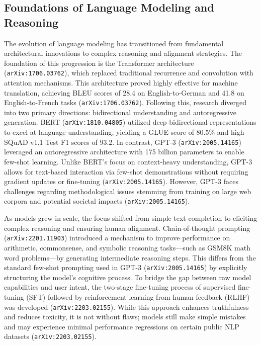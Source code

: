 \documentclass[11pt]{article}
\begin{document}
\subsection{Foundations of Language Modeling and Reasoning}

The evolution of language modeling has transitioned from fundamental architectural innovations to complex reasoning and alignment strategies. The foundation of this progression is the Transformer architecture (\texttt{arXiv:1706.03762}), which replaced traditional recurrence and convolution with attention mechanisms. This architecture proved highly effective for machine translation, achieving BLEU scores of 28.4 on English-to-German and 41.8 on English-to-French tasks (\texttt{arXiv:1706.03762}). Following this, research diverged into two primary directions: bidirectional understanding and autoregressive generation. BERT (\texttt{arXiv:1810.04805}) utilized deep bidirectional representations to excel at language understanding, yielding a GLUE score of 80.5\% and high SQuAD v1.1 Test F1 scores of 93.2. In contrast, GPT-3 (\texttt{arXiv:2005.14165}) leveraged an autoregressive architecture with 175 billion parameters to enable few-shot learning. Unlike BERT’s focus on context-heavy understanding, GPT-3 allows for text-based interaction via few-shot demonstrations without requiring gradient updates or fine-tuning (\texttt{arXiv:2005.14165}). However, GPT-3 faces challenges regarding methodological issues stemming from training on large web corpora and potential societal impacts (\texttt{arXiv:2005.14165}).

As models grew in scale, the focus shifted from simple text completion to eliciting complex reasoning and ensuring human alignment. Chain-of-thought prompting (\texttt{arXiv:2201.11903}) introduced a mechanism to improve performance on arithmetic, commonsense, and symbolic reasoning tasks—such as GSM8K math word problems—by generating intermediate reasoning steps. This differs from the standard few-shot prompting used in GPT-3 (\texttt{arXiv:2005.14165}) by explicitly structuring the model's cognitive process. To bridge the gap between raw model capabilities and user intent, the two-stage fine-tuning process of supervised fine-tuning (SFT) followed by reinforcement learning from human feedback (RLHF) was developed (\texttt{arXiv:2203.02155}). While this approach enhances truthfulness and reduces toxicity, it is not without flaws; models still make simple mistakes and may experience minimal performance regressions on certain public NLP datasets (\texttt{arXiv:2203.02155}).
\end{document}
